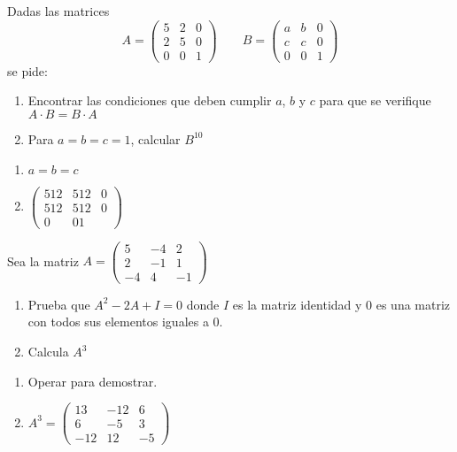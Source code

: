 \begin{ejer}
 Dadas las matrices 
\[ A=\begin{pmatrix}
5 & 2 & 0 \\
2 & 5 & 0 \\
0 & 0 & 1
\end{pmatrix}
\qquad
B=\begin{pmatrix}
a & b & 0 \\
c & c & 0 \\
0 & 0 & 1
\end{pmatrix}\]
se pide:

\begin{enumerate}[label=\alph*)]
\item Encontrar las condiciones que deben cumplir $a$, $b$ y $c$ para que se verifique $A\cdot B = B \cdot A$
\item Para $a=b=c=1$, calcular $B^{10}$
\end{enumerate}
\begin{solu}
\begin{enumerate}[label=\alph*)]
\item $a=b=c$
\item $\begin{pmatrix} 512 & 512 & 0 \\ 512 & 512 & 0 \\ 0 & 0  1 \end{pmatrix}$
\end{enumerate}

\end{solu}
\end{ejer}

\begin{ejer} Sea la matriz 
$A=\begin{pmatrix}
5 & -4 & 2 \\ 
 2 & -1 & 1 \\ 
-4 & 4 & -1
\end{pmatrix}
$

\begin{enumerate}[label=\alph*)]
\item Prueba que $A^2-2A+I=0$ donde $I$ es la matriz identidad y $0$ es una matriz con todos sus elementos iguales a 0.
\item Calcula $A^3$
\end{enumerate}
\begin{solu}
\begin{enumerate}[label=\alph*)]
\item Operar para demostrar.
\item $A^3=\begin{pmatrix} 13&-12&6 \\ 6&-5&3 \\ -12&12&-5 \end{pmatrix} $
\end{enumerate}

\end{solu}
\end{ejer}

